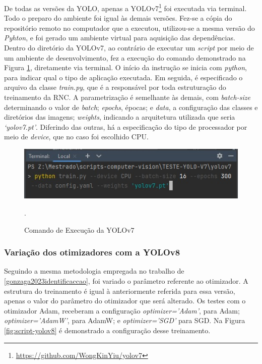 De todas as versões da YOLO, apenas a YOLOv7\footnote{\url{https://github.com/WongKinYiu/yolov7}} foi executada via terminal. Todo o preparo do ambiente foi igual às demais versões. Fez-se a cópia do repositório remoto no computador que a executou, utilizou-se a mesma versão do \textit{Pyhton}, e foi gerado um ambiente virtual para aquisição das dependências. Dentro do diretório da YOLOv7, ao contrário de executar um \textit{script} por meio de um ambiente de desenvolvimento, fez a execução do comando demonstrado na Figura \ref{fig:script-yolov7}, diretamente via terminal. O início da instrução se inicia com \textit{python}, para indicar qual o tipo de aplicação executada. Em seguida, é especificado o arquivo da classe \textit{train.py}, que é a responsável por toda estruturação do treinamento da RNC.  A parametrização é semelhante às demais, com \textit{batch-size} determinando o valor de \textit{batch}; \textit{epochs}, épocas; e \textit{data}, a configuração das classes e diretórios das imagens; \textit{weights}, indicando a arquitetura utilizada que seria \textit{‘yolov7.pt’}. Diferindo das outras, há a especificação do tipo de processador por meio de \textit{device}, que no caso foi escolhido CPU.

\begin{figure}[!h]
    \centering
    \begin{minipage}{0.7\linewidth}
    \centering
    \captionsetup{justification=centering,margin=0.5cm,font=small}
    \includegraphics[width=1\linewidth]{img/cap5/script-yolov7.jpg}
    \caption{Comando de Execução da YOLOv7}.
    \label{fig:script-yolov7}
    \end{minipage}
\end{figure}

\subsubsection{Variação dos otimizadores com a YOLOv8}

Seguindo a mesma metodologia empregada no trabalho de \ref{gonzaga2023identificaccao}, foi variado o parâmetro referente ao otimizador. A estrutura do treinamento é igual à anteriormente referida para essa versão, apenas o valor do parâmetro do otimizador que será alterado. Os testes com o otimizador Adam, receberam a configuração \textit{optimizer=’Adam’}, para Adam; \textit{optimizer=’AdamW’}, para AdamW; e \textit{optimizer=’SGD’} para SGD. Na Figura \ref{fig:script-yolov8} é demonstrado a configuração desse treinamento.

